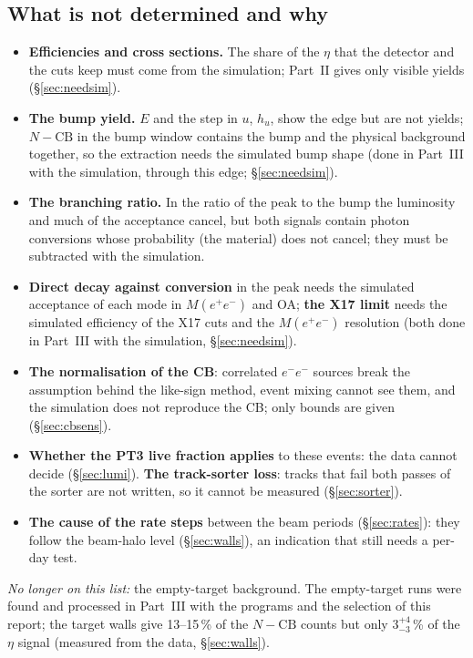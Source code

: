 \documentclass[11pt,a4paper]{article}
\newcommand{\Mee}{\ensuremath{M(e^{+}e^{-})}\xspace}
\begin{document}
\subsection{What is not determined and why}
\label{sec:notdet}
\begin{itemize}
\setlength{\itemsep}{0pt}
\item \textbf{Efficiencies and cross sections.} The share of the $\eta$ that the detector and the cuts keep must come from the
      simulation; Part~II gives only visible yields (\S\ref{sec:needsim}).
\item \textbf{The bump yield.} $E$ and the step in $u$, $h_u$, show the edge but are not yields; $N-\mathrm{CB}$ in the bump window contains the bump and the
      physical background together, so the extraction needs the simulated bump shape (done in Part~III with the simulation, through
      this edge; \S\ref{sec:needsim}).
\item \textbf{The branching ratio.} In the ratio of the peak to the bump the luminosity and much of the acceptance cancel, but both
      signals contain photon conversions whose probability (the material) does not cancel; they must be subtracted with the
      simulation.
\item \textbf{Direct decay against conversion} in the peak needs the simulated acceptance of each mode in \Mee and OA; \textbf{the
      X17 limit} needs the simulated efficiency of the X17 cuts and the \Mee resolution (both done in Part~III with the simulation,
      \S\ref{sec:needsim}).
\item \textbf{The normalisation of the CB}: correlated $e^-e^-$ sources break the assumption behind the like-sign method, event
      mixing cannot see them, and the simulation does not reproduce the CB; only bounds are given (\S\ref{sec:cbsens}).
\item \textbf{Whether the PT3 live fraction applies} to these events: the data cannot decide (\S\ref{sec:lumi}). \textbf{The
      track-sorter loss}: tracks that fail both passes of the sorter are not written, so it cannot be measured (\S\ref{sec:sorter}).
\item \textbf{The cause of the rate steps} between the beam periods (\S\ref{sec:rates}): they follow the beam-halo level
      (\S\ref{sec:walls}), an indication that still needs a per-day test.
\end{itemize}
\emph{No longer on this list:} the empty-target background. The empty-target runs were found and processed in Part~III with the
programs and the selection of this report; the target walls give 13--15\,\% of the $N-\mathrm{CB}$ counts but only $3^{+4}_{-3}$\,\% of the
$\eta$ signal (measured from the data, \S\ref{sec:walls}).
\end{document}
